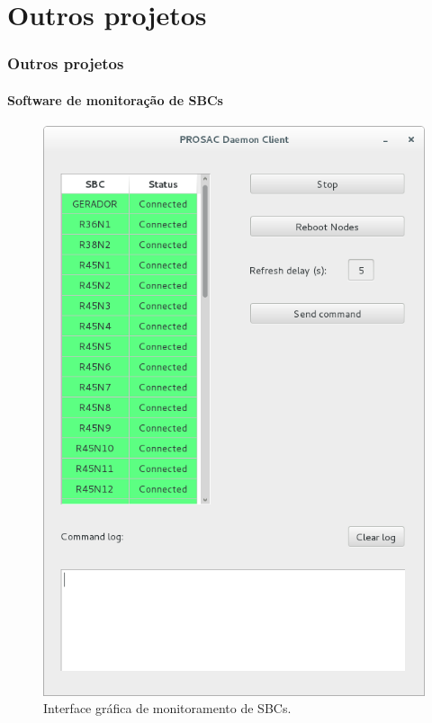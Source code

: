 \section{Outros projetos}

\begin{frame}
\frametitle{Outros projetos}
\framesubtitle{Software de monitoração de SBCs}

\begin{figure}[h]

    \centering
    \includegraphics[height=0.7\textheight]{image/sbc}
    \caption {Interface gráfica de monitoramento de SBCs.}
    \label{fig:sbcs}
\end{figure}

\end{frame}

